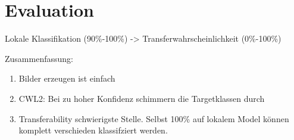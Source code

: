 
\section{Evaluation}
Lokale Klassifikation (90\%-100\%) -> Transferwahrscheinlichkeit (0\%-100\%)

Zusammenfassung:
\begin{enumerate}
\item Bilder erzeugen ist einfach
\item CWL2: Bei zu hoher Konfidenz schimmern die Targetklassen durch
\item Transferability schwierigste Stelle. Selbst 100\% auf lokalem Model können komplett verschieden klassifziert werden.
\end{enumerate}
